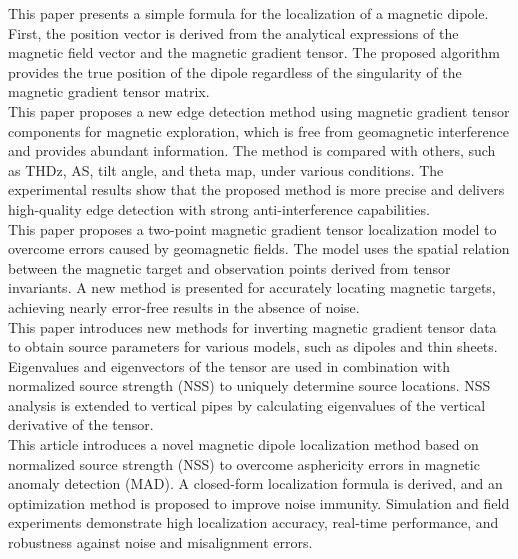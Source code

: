 \cite{single_closed_formula_position} 
This paper presents a simple formula for the localization of a magnetic dipole. First, 
the position vector is derived from the analytical expressions of the magnetic field 
vector and the magnetic gradient tensor. The proposed algorithm provides the true 
position of the dipole regardless of the singularity of the magnetic gradient tensor 
matrix. \\

\cite{multiple_real_plots_invariants} 
This paper proposes a new edge detection method using magnetic gradient tensor components 
for magnetic exploration, which is free from geomagnetic interference and provides 
abundant information. The method is compared with others, such as THDz, AS, tilt angle, 
and theta map, under various conditions. The experimental results show that the proposed 
method is more precise and delivers high-quality edge detection with strong 
anti-interference capabilities. \\

\cite{NSS_formula_important} 
This paper proposes a two-point magnetic gradient tensor localization model to overcome 
errors caused by geomagnetic fields. The model uses the spatial relation between the 
magnetic target and observation points derived from tensor invariants. A new method is 
presented for accurately locating magnetic targets, achieving nearly error-free results 
in the absence of noise. \\

\cite{NSS_single_different_dimensions} 
This paper introduces new methods for inverting magnetic gradient tensor data to obtain 
source parameters for various models, such as dipoles and thin sheets. Eigenvalues and 
eigenvectors of the tensor are used in combination with normalized source strength (NSS) 
to uniquely determine source locations. NSS analysis is extended to vertical pipes by 
calculating eigenvalues of the vertical derivative of the tensor. \\

\cite{NSS_single_localization} 
This article introduces a novel magnetic dipole localization method based on normalized 
source strength (NSS) to overcome asphericity errors in magnetic anomaly detection (MAD). 
A closed-form localization formula is derived, and an optimization method is proposed to 
improve noise immunity. Simulation and field experiments demonstrate high localization 
accuracy, real-time performance, and robustness against noise and misalignment errors. \\

